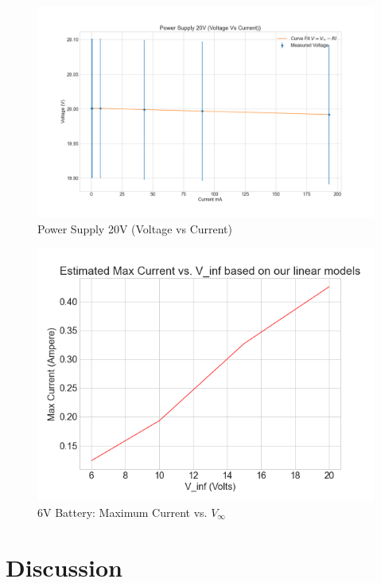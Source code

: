 \documentclass[letterpaper,12pt]{article}
\begin{document}
\begin{figure}[H]
  \centering
  \includegraphics[width=0.95\linewidth]{../code/Fredrik/Power supply 20V lab5_voltage_vs_current.png}    
  \caption{Power Supply 20V (Voltage vs Current)}
  \label{ps-20}
\end{figure}

\begin{figure}[H]
  \centering
  \includegraphics[width=0.95\linewidth]{../code/Fredrik/Estimated Max Current vs. V_inf based on our linear models.png}    
  \caption{6V Battery: Maximum Current vs. $V_{\infty}$ }
  \label{ps-max-c}
\end{figure}

\section{Discussion}
\end{document}
